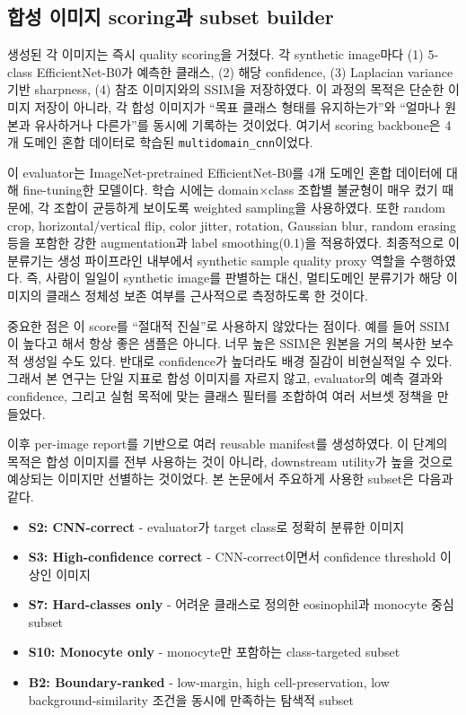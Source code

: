 \documentclass[11pt]{article}
\begin{document}
\subsection{합성 이미지 scoring과 subset builder}

생성된 각 이미지는 즉시 quality scoring을 거쳤다. 각 synthetic image마다 (1) 5-class EfficientNet-B0가 예측한 클래스, (2) 해당 confidence, (3) Laplacian variance 기반 sharpness, (4) 참조 이미지와의 SSIM을 저장하였다. 이 과정의 목적은 단순한 이미지 저장이 아니라, 각 합성 이미지가 ``목표 클래스 형태를 유지하는가''와 ``얼마나 원본과 유사하거나 다른가''를 동시에 기록하는 것이었다. 여기서 scoring backbone은 4개 도메인 혼합 데이터로 학습된 \texttt{multidomain\_cnn}이었다.

이 evaluator는 ImageNet-pretrained EfficientNet-B0를 4개 도메인 혼합 데이터에 대해 fine-tuning한 모델이다. 학습 시에는 domain$\times$class 조합별 불균형이 매우 컸기 때문에, 각 조합이 균등하게 보이도록 weighted sampling을 사용하였다. 또한 random crop, horizontal/vertical flip, color jitter, rotation, Gaussian blur, random erasing 등을 포함한 강한 augmentation과 label smoothing(0.1)을 적용하였다. 최종적으로 이 분류기는 생성 파이프라인 내부에서 synthetic sample quality proxy 역할을 수행하였다. 즉, 사람이 일일이 synthetic image를 판별하는 대신, 멀티도메인 분류기가 해당 이미지의 클래스 정체성 보존 여부를 근사적으로 측정하도록 한 것이다.

중요한 점은 이 score를 ``절대적 진실''로 사용하지 않았다는 점이다. 예를 들어 SSIM이 높다고 해서 항상 좋은 샘플은 아니다. 너무 높은 SSIM은 원본을 거의 복사한 보수적 생성일 수도 있다. 반대로 confidence가 높더라도 배경 질감이 비현실적일 수 있다. 그래서 본 연구는 단일 지표로 합성 이미지를 자르지 않고, evaluator의 예측 결과와 confidence, 그리고 실험 목적에 맞는 클래스 필터를 조합하여 여러 서브셋 정책을 만들었다.

이후 per-image report를 기반으로 여러 reusable manifest를 생성하였다. 이 단계의 목적은 합성 이미지를 전부 사용하는 것이 아니라, downstream utility가 높을 것으로 예상되는 이미지만 선별하는 것이었다. 본 논문에서 주요하게 사용한 subset은 다음과 같다.
\begin{itemize}
  \item \textbf{S2: CNN-correct} - evaluator가 target class로 정확히 분류한 이미지
  \item \textbf{S3: High-confidence correct} - CNN-correct이면서 confidence threshold 이상인 이미지
  \item \textbf{S7: Hard-classes only} - 어려운 클래스로 정의한 eosinophil과 monocyte 중심 subset
  \item \textbf{S10: Monocyte only} - monocyte만 포함하는 class-targeted subset
  \item \textbf{B2: Boundary-ranked} - low-margin, high cell-preservation, low background-similarity 조건을 동시에 만족하는 탐색적 subset
\end{itemize}
\end{document}
